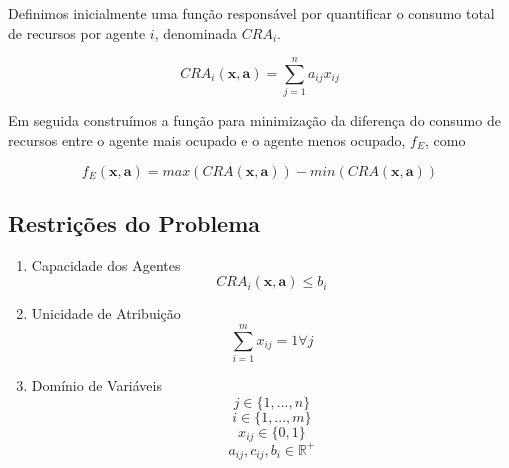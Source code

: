 Definimos inicialmente uma função responsável por quantificar o consumo
total de recursos por agente $i$, denominada $CRA_i$.

$$ CRA_{i} (\mathbf{x}, \mathbf{a}) =  \sum^{n}_{j=1} a_{ij} x_{ij} $$

Em seguida construímos a função para minimização da diferença do consumo de
recursos entre o agente mais ocupado e o agente menos ocupado, $f_E$, como

$$ f_E(\mathbf{x}, \mathbf{a}) = max(CRA(\mathbf{x}, \mathbf{a})) - min(CRA(\mathbf{x}, \mathbf{a}))$$

\subsection{Restrições do Problema}

\begin{enumerate}[label=(\roman*)]
    \item Capacidade dos Agentes
        $$ CRA_{i} (\mathbf{x}, \mathbf{a}) \leq b_i $$
    \item Unicidade de Atribuição
        $$\sum^{m}_{i=1} x_{ij} = 1 \forall j$$
    \item Domínio de Variáveis
        $$j \in \{1, ..., n\}$$
        $$i \in \{1, ..., m\}$$
        $$x_{ij} \in \{0, 1\}$$
        $$a_{ij}, c_{ij}, b_i \in \mathbb{R}^{+}$$
\end{enumerate}


